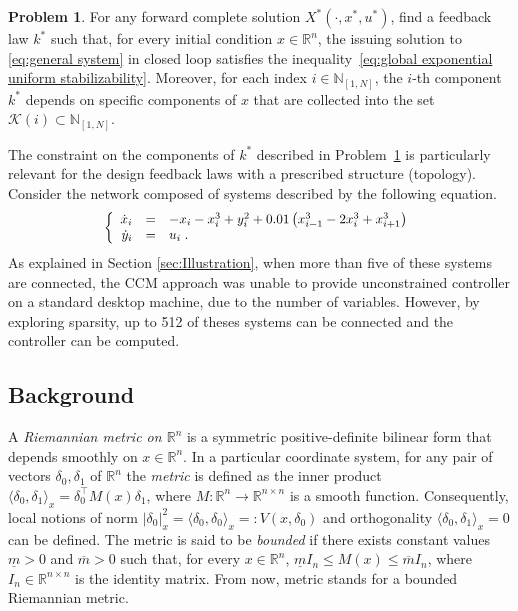 \documentclass[10pt,twocolumn,twoside]{IEEEtran}
\theoremstyle{plain}
\theoremstyle{definition}
\newtheorem{problem}{Problem}
\theoremstyle{remark}
\begin{document}
\begin{problem}\label{problem formulation}
	For any forward complete solution $X^\ast(\cdot,x^\ast,u^\ast)$, find a feedback law $k^\ast$ such that, for every initial condition $x\in\mathbb{R}^n$, the issuing solution to  \eqref{eq:general system} in closed loop satisfies the inequality~\eqref{eq:global exponential uniform stabilizability}. Moreover, for each index $i\in\mathbb{N}_{[1,N]}$, the $i$-th component $k^\ast$ depends on specific components of $x$ that are collected into the set $\mathscr{K}(i)\subset\mathbb{N}_{[1,N]}$.
\end{problem}


The constraint on the components of $k^\ast$ described in Problem~\ref{problem formulation} is particularly relevant for the design feedback laws with a prescribed structure (topology). Consider the network composed of systems described by the following equation.
\begin{equation}\label{eq:example}
	\scalebox{0.95}{$\left\{\begin{array}{rcl}
		\dot{x}_i&=&-x_i-x_i^3+y_i^2 + 0.01\left(x_{i-1}^3 - 2x_i^3 +x_{i+1}^3\right)\\
		\dot{y}_i&=&u_i\;.
	\end{array}\right.$}
\end{equation}
As explained in Section \ref{sec:Illustration}, when more than five of these systems are connected, the CCM approach was unable to provide unconstrained controller on a standard desktop machine, due to the number of variables. However, by exploring sparsity, up to 512 of theses systems can be connected and the controller can be computed. 

\subsection{Background}\label{sec:background}

A \emph{Riemannian metric on $\mathbb{R}^n$} is a symmetric positive-definite bilinear form that depends smoothly on $x\in\mathbb{R}^n$. In a particular coordinate system, for any pair of vectors $\delta_0,\delta_1$ of $\mathbb{R}^n$ the \emph{metric} is defined as the inner product $\langle\delta_0,\delta_{ 1}\rangle_x=\delta_0^\top M(x)\delta_1$, where $M:\mathbb{R}^n\to\mathbb{R}^{n\times n}$ is a smooth function. Consequently, local notions of norm $|\delta_0|_x^2=\langle\delta_0,\delta_0\rangle_x=:V(x,\delta_0)$ and orthogonality $\langle\delta_0,\delta_1\rangle_x=0$ can be defined. The metric is said to be \emph{bounded} if there exists constant values $\underline{m}>0$ and $\overline{m}>0$ such that, for every $x\in\mathbb{R}^n$, $\underline{m}I_n\leq M(x)\leq \overline{m}I_n$, where $I_n\in\mathbb{R}^{n\times n}$ is the identity matrix. From now, metric stands for a bounded Riemannian metric.
\end{document}
